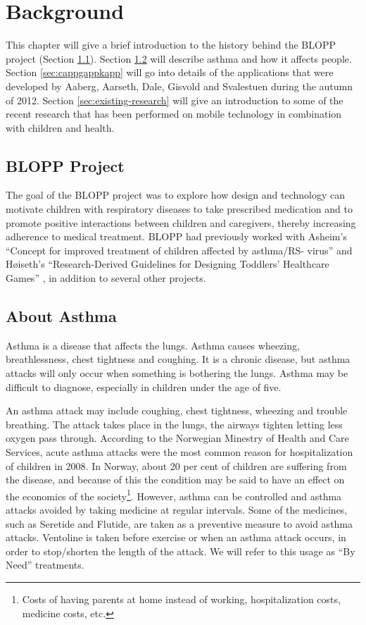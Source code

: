 \chapter{Background}
\label{chp:background}

This chapter will give a brief introduction to the history behind the BLOPP project (Section \ref{sec:bloppproject}). Section \ref{sec:about-asthma} will describe asthma and how it affects people. Section \ref{sec:cappgappkapp} will go into details of the applications that were developed by Aaberg, Aarseth, Dale, Gisvold and Svalestuen during the autumn of 2012.     
Section \ref{sec:existing-research} will give an introduction to some of the recent research that has been performed on mobile technology in combination with children and health.   


\section{BLOPP Project}
\label{sec:bloppproject}
The goal of the BLOPP project was to explore how design and technology can motivate children with respiratory diseases to take prescribed medication and to promote positive interactions between children and caregivers, thereby increasing adherence to medical treatment. BLOPP had previously worked with Asheim's ``Concept for improved treatment of children affected by asthma/RS- virus''\cite{asheim2012konsept} and H\o iseth's ``Research-Derived Guidelines for Designing Toddlers' Healthcare Games'' \cite{hoiseth2013research}, in addition to several other projects.


\section{About Asthma}
\label{sec:about-asthma}
Asthma is a disease that affects the lungs. Asthma causes wheezing, breathlessness, chest tightness and coughing. It is a chronic disease, but asthma attacks will only occur when something is bothering the lungs. Asthma may be difficult to diagnose, especially in children under the age of five. 


An asthma attack may include coughing, chest tightness, wheezing and trouble breathing. The attack takes place in the lungs, the airways tighten letting less oxygen pass through.
According to the Norwegian Minestry of Health and Care Services, acute asthma attacks were the most common reason for hospitalization of children in 2008\cite{NationalStrategy}. In Norway, about 20 per cent of children are suffering from the disease, and because of this the condition may be said to have an effect on the economics of the society\footnote{Costs of having parents at home instead of working, hospitalization costs, medicine costs, etc.}. However, asthma can be controlled and asthma attacks avoided by taking medicine at regular intervals. Some of the medicines, such as Seretide and Flutide, are taken as a preventive measure to avoid asthma attacks. Ventoline is taken before exercise or when an asthma attack occurs, in order to stop/shorten the length of the attack. We will refer to this usage as ``By Need'' treatments. 

